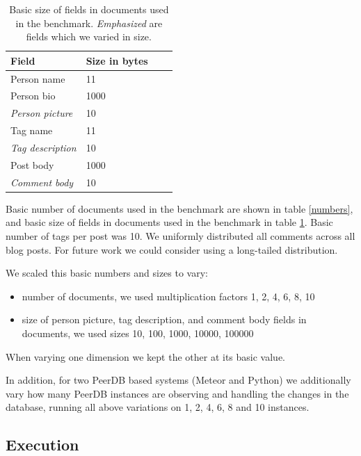 \begin{table}
  \small
  \begin{center}
  \begin{tabular}{|l|l|l|l|}
    \hline
    Field & Size in bytes\\
    \hline
    Person name & 11 \\
    Person bio & 1000 \\ 
    \emph{Person picture} & 10 \\
    Tag name & 11 \\ 
    \emph{Tag description} & 10 \\
    Post body & 1000 \\
    \emph{Comment body} & 10 \\
    \hline

  \end{tabular}
  \end{center}
  \caption{Basic size of fields in documents used in the benchmark.
  \emph{Emphasized} are fields which we varied in size.}
  \label{sizes}
\end{table}

Basic number of documents used in the benchmark are shown in table \ref{numbers}, and basic size of fields in documents used in the benchmark in table \ref{sizes}.
Basic number of tags per post was 10.
We uniformly distributed all comments across all blog posts. For future work we could consider using a long-tailed distribution.

We scaled this basic numbers and sizes to vary:
\begin{itemize}
\item number of documents, we used multiplication factors 1, 2, 4, 6, 8, 10
\item size of person picture, tag description, and comment body fields in documents, we used sizes 10, 100, 1000, 10000, 100000
\end{itemize}

When varying one dimension we kept the other at its basic value.

In addition, for two PeerDB based systems (Meteor and Python) we additionally vary how many PeerDB instances are observing and handling the changes in the database, running all above variations on 1, 2, 4, 6, 8 and 10 instances.

\subsection{Execution}


